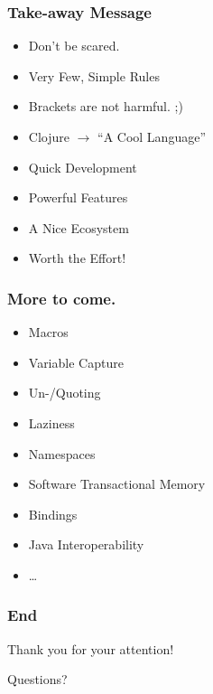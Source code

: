 \documentclass{beamer}
\begin{document}
  \begin{frame}[c]
    \frametitle{Take-away Message}
    \begin{itemize}
        \item Don't be scared.
        \item Very Few, Simple Rules
        \item Brackets are not harmful. ;)
        \item Clojure $\rightarrow$ ``A Cool Language''
        \item Quick Development
        \item Powerful Features
        \item A Nice Ecosystem
        \item Worth the Effort!
    \end{itemize}
  \end{frame}

  \begin{frame}[c]
    \frametitle{More to come.}
    \begin{itemize}
          \item Macros
          \item Variable Capture
          \item Un-/Quoting
          \item Laziness
          \item Namespaces
          \item Software Transactional Memory
          \item Bindings
          \item Java Interoperability
          \item \ldots
    \end{itemize}
  \end{frame}

  \begin{frame}[c]
    \frametitle{End}
    \begin{block}{Thank you for your attention!}
      \pause
      \begin{center}Questions?\end{center}
    \end{block}
  \end{frame}
\end{document}
